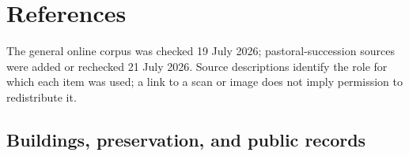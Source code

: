 \section{References}

The general online corpus was checked 19 July 2026; pastoral-succession sources were added or rechecked 21 July 2026. Source descriptions identify the role for which each item was used; a link to a scan or image does not imply permission to redistribute it.

\begingroup
\setlength{\parskip}{0.2em}

\subsection{Buildings, preservation, and public records}

